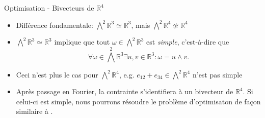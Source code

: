 \documentclass[10pt, envcountsect]{beamer}
\theoremstyle{plain}
\newcommand{\R}{\mathbb{R}}
\begin{document}
\begin{frame}{Optimisation - Bivecteurs de $\R^4$}
\begin{itemize}
\item Différence fondamentale: $\bigwedge^2 \R^3 \simeq \R^3$, mais $\bigwedge^2 \R^4 \not \simeq \R^4$

\item $\bigwedge^2  \R^3 \simeq \R^3$ implique que tout $\omega \in \bigwedge^2 \R^3$ est \emph{simple}, c'est-à-dire que
\begin{equation}
\forall \omega \in \bigwedge^2 \R^3 \exists u,v \in \R^3: \omega = u \wedge v.
\end{equation}

\item Ceci n'est plus le cas pour $\bigwedge^2\R^4$, e.g. $e_{12} + e_{34} \in \bigwedge^2\R^4$ n'est pas simple


\item Après passage en Fourier, la contrainte s'identifiera à un bivecteur de $\R^4$. Si celui-ci est simple, nous pourrons résoudre le problème d'optimisaton de façon similaire à \cite{Alouges2017}.

\end{itemize}
\end{frame}
\end{document}
